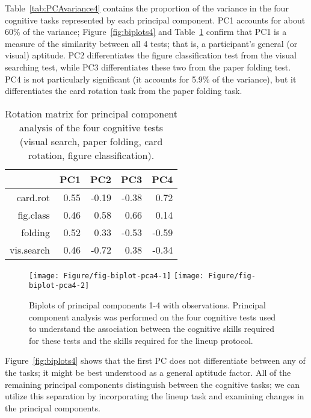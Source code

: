 \documentclass[journal]{vgtc}\usepackage[]{graphicx}\usepackage[]{color}
\newenvironment{knitrout}{}{} %
\begin{document}
Table~\ref{tab:PCAvariance4} contains the proportion of the variance in the four cognitive tasks represented by each principal component. PC1 accounts for about 60\% of the variance; Figure~\ref{fig:biplots4} and Table~\ref{tab:PCArotation4} confirm that PC1 is a measure of the similarity between all 4 tests; that is, a participant's general (or visual) aptitude. PC2 differentiates the figure classification test from the visual searching test, while PC3 differentiates these two from the paper folding test. PC4 is not particularly significant (it accounts for 5.9\% of the variance), but it differentiates the card rotation task from the paper folding task.

\begin{table}[htb]
\centering
\caption{Rotation matrix for principal component analysis of the four cognitive tests (visual search, paper folding, card rotation, figure classification).\label{tab:PCArotation4}} 
\begin{tabular}{rrrrr}
  \hline
 & PC1 & PC2 & PC3 & PC4 \\ 
  \hline
card.rot & 0.55 & -0.19 & -0.38 & 0.72 \\ 
  fig.class & 0.46 & 0.58 & 0.66 & 0.14 \\ 
  folding & 0.52 & 0.33 & -0.53 & -0.59 \\ 
  vis.search & 0.46 & -0.72 & 0.38 & -0.34 \\ 
   \hline
\end{tabular}
\end{table}


\begin{knitrout}
\color{fgcolor}\begin{figure}[]


{\centering \texttt{[image: Figure/fig-biplot-pca4-1]} 
\texttt{[image: Figure/fig-biplot-pca4-2]} 

}

\caption{Biplots of principal components 1-4 with observations. Principal component analysis was performed on the four cognitive tests used to understand the association between the cognitive skills required for these tests and the skills required for the lineup protocol.  \label{fig:biplots4}\label{fig:biplot-pca4}}
\end{figure}


\end{knitrout}
Figure~\ref{fig:biplots4} shows that the first PC does not differentiate between any of the tasks; it might be best understood as a general aptitude factor. All of the remaining principal components distinguish between the cognitive tasks; we can utilize this separation by incorporating the lineup task and examining changes in the principal components. 
\end{document}
